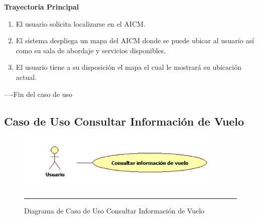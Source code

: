 \begin{flushleft}
	\textbf{Trayectoria Principal}\\
	\begin{enumerate}
		\item El usuario solicita localizarse en el AICM.
		\item El sistema despliega un mapa del AICM donde se puede ubicar al usuario así como su sala de abordaje y servicios disponibles.
		\item El usuario tiene a su disposición el mapa el cual le mostrará su ubicación actual.
	\end{enumerate}
\end{flushleft}
----Fin del caso de uso
\newpage
\subsection{Caso de Uso Consultar Información de Vuelo}

\begin{figure}[htbp]
	\centering
		\includegraphics[width=0.9\textwidth]{Figuras/cuConsultarInformacionVuelo.png}
		\rule{30em}{0.5pt}
	\caption[Diagrama de Caso de Uso Consultar Información de Vuelo]{Diagrama de Caso de Uso Consultar Información de Vuelo}
	\label{fig:cuConsultarInformacionVuelo}
\end{figure}


